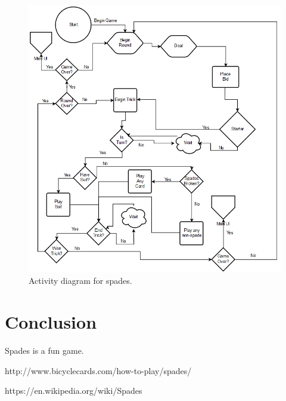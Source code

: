\documentclass[journal, a4paper]{Spades_Logic_Dependency/IEEEtran}
\begin{document}
		\begin{figure}[!hbt]
		\begin{center}
		\includegraphics[width=\columnwidth]{graphics/logicDiagram}
		\caption{Activity diagram for spades.}
		\label{Figure 1}
		\end{center}
	\end{figure}
	

\section{Conclusion}
	Spades is a fun game. 

\begin{thebibliography}{5}

	http://www.bicyclecards.com/how-to-play/spades/ 

	https://en.wikipedia.org/wiki/Spades

\end{thebibliography}

\end{document}
